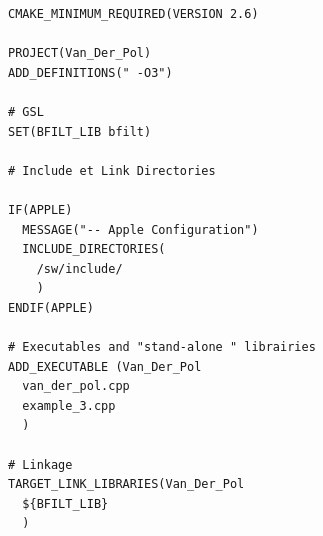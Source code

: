 \begin{DocInclude}\begin{verbatim}CMAKE_MINIMUM_REQUIRED(VERSION 2.6)

PROJECT(Van_Der_Pol)
ADD_DEFINITIONS(" -O3")

# GSL
SET(BFILT_LIB bfilt)

# Include et Link Directories

IF(APPLE)
  MESSAGE("-- Apple Configuration")
  INCLUDE_DIRECTORIES(
    /sw/include/
    )
ENDIF(APPLE)

# Executables and "stand-alone " librairies
ADD_EXECUTABLE (Van_Der_Pol
  van_der_pol.cpp
  example_3.cpp
  )

# Linkage
TARGET_LINK_LIBRARIES(Van_Der_Pol
  ${BFILT_LIB}     
  )
\end{verbatim}
\end{DocInclude}
 